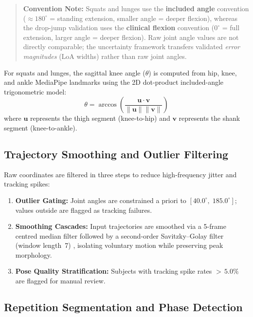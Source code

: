 \begin{quote}
\textbf{Convention Note:} Squats and lunges use the \textbf{included angle} convention ($\approx 180^\circ$ = standing extension, smaller angle = deeper flexion), whereas the drop-jump validation uses the \textbf{clinical flexion} convention ($0^\circ$ = full extension, larger angle = deeper flexion). Raw joint angle values are not directly comparable; the uncertainty framework transfers validated \textit{error magnitudes} (LoA widths) rather than raw joint angles.
\end{quote}

For squats and lunges, the sagittal knee angle ($\theta$) is computed from hip, knee, and ankle MediaPipe landmarks using the 2D dot-product included-angle trigonometric model:
\begin{equation}
\theta = \arccos \left( \frac{\mathbf{u} \cdot \mathbf{v}}{\|\mathbf{u}\| \|\mathbf{v}\|} \right)
\label{eq:knee-angle}
\end{equation}
where $\mathbf{u}$ represents the thigh segment (knee-to-hip) and $\mathbf{v}$ represents the shank segment (knee-to-ankle).

\subsection{Trajectory Smoothing and Outlier Filtering}
\label{sec:smoothing}

Raw coordinates are filtered in three steps to reduce high-frequency jitter and tracking spikes:
\begin{enumerate}
  \item \textbf{Outlier Gating:} Joint angles are constrained a priori to $[40.0^\circ,\; 185.0^\circ]$; values outside are flagged as tracking failures.
  \item \textbf{Smoothing Cascades:} Input trajectories are smoothed via a 5-frame centred median filter followed by a second-order Savitzky--Golay filter (window length~7) \citep{Savitzky_Golay_1964}, isolating voluntary motion while preserving peak morphology.
  \item \textbf{Pose Quality Stratification:} Subjects with tracking spike rates ${>}\,5.0\%$ are flagged for manual review.
\end{enumerate}

\subsection{Repetition Segmentation and Phase Detection}
\label{sec:segmentation}

